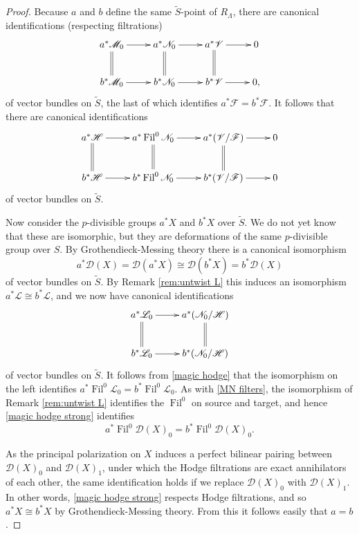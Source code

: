 \documentclass[11pt]{alggeom}
\newcommand{\iso}{\cong}
\DeclareMathOperator{\Fil}{Fil}
\begin{document}
\begin{proof}
Because $a$ and $b$ define the same $\widetilde{S}$-point of $R_\Lambda$, there are  canonical identifications (respecting filtrations)
\[
\xymatrix{
{ a^*\mathscr{M}_0 } \ar[r]  \ar@{=}[d]  & {  a^*\mathscr{N}_0 }  \ar[r]   \ar@{=}[d] & {  a^*\mathscr{V} } \ar[r]  \ar@{=}[d] & 0  \\ 
{ b^*\mathscr{M}_0 } \ar[r] & {  b^*\mathscr{N}_0 }  \ar[r]  & {  b^*\mathscr{V} }  \ar[r]& 0  ,
}
\]
 of vector bundles on $\widetilde{S}$, the last of which
 identifies $a^*\mathscr{F} = b^* \mathscr{F}$.  It follows that there are canonical identifications 
 \[
\xymatrix{
{ a^*\mathscr{H}} \ar[r]  \ar@{=}[d]  & {  a^* \Fil^0\mathscr{N}_0 }  \ar[r]   \ar@{=}[d] & {  a^*(\mathscr{V}/\mathscr{F} )} \ar[r]  \ar@{=}[d] & 0  \\ 
{ b^*\mathscr{H} } \ar[r] & {  b^*\Fil^0\mathscr{N}_0 }  \ar[r]  & {  b^*(\mathscr{V} / \mathscr{F})}  \ar[r]& 0  
}
\]
 of vector bundles on $\widetilde{S}$.


Now consider the $p$-divisible groups $a^*X$ and $b^*X$ over $\widetilde{S}$.
We do not yet know that these are isomorphic, but  they  are deformations of the same $p$-divisible group over $S$.  By Grothendieck-Messing theory there is a canonical isomorphism 
\begin{equation}\label{magic hodge strong}
a^* \mathscr{D}(X) = \mathscr{D}(a^*X) \iso \mathscr{D}(b^*X)=b^* \mathscr{D}(X) 
\end{equation}
of vector bundles on $\widetilde{S}$.
By Remark \ref{rem:untwist L}  this induces an isomorphism $a^*\mathscr{L} \iso b^*\mathscr{L}$, 
and we now have canonical identifications
\[
\xymatrix{
 {  a^* \mathscr{L}_0 }  \ar[r]   \ar@{=}[d] & {  a^*(\mathscr{N}_0/\mathscr{H} )}  \ar@{=}[d]   \\ 
 {  b^*\mathscr{L}_0 }  \ar[r]  & {  b^*(\mathscr{N}_0/\mathscr{H} )}  
}
\]
of vector bundles on $\widetilde{S}$.
It  follows from \eqref{magic hodge} that the isomorphism on the left identifies $a^*\Fil^0 \mathscr{L}_0 = b^*\Fil^0 \mathscr{L}_0$.  
As with \eqref{MN filters}, the  isomorphism of Remark \ref{rem:untwist L} identifies the $\Fil^0$ on source and target, and hence  \eqref{magic hodge strong} identifies
\[
a^* \Fil^0 \mathscr{D}(X)_0 = b^* \Fil^0 \mathscr{D}(X)_0.
\]


As the principal polarization on $X$ induces a perfect bilinear pairing between $\mathscr{D}(X)_0$ and $\mathscr{D}(X)_1$,  under which  the Hodge filtrations are exact annihilators of each other, the same identification holds if we replace $\mathscr{D}(X)_0$ with $\mathscr{D}(X)_1$.  
In other words, \eqref{magic hodge strong} respects Hodge filtrations, and so $a^*X\iso b^*X$ by Grothendieck-Messing theory.
From this it follows easily that $a=b$.


\end{proof}
\end{document}
